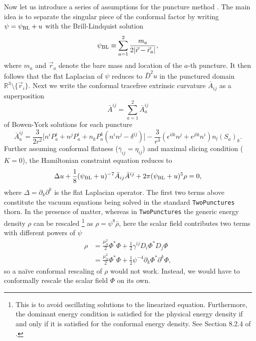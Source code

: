 Now let us introduce a series of assumptions for the puncture method
\cite{scalar_TwoPunctures_BBHSF_Brandt:1997tf}.
The main idea is to separate the singular piece of the conformal factor by writing
$ \psi = \psi_{\rm BL} + u $
with the Brill-Lindquist solution
\begin{equation}
    \psi_{\rm BL} \equiv \sum_{a=1}^2 \frac{m_a}{2|\vec{r} - \vec{r}_a|},
\end{equation}
where $m_a$ and $\vec{r}_a$ denote the bare mass and location of the $a$-th puncture.
It then follows that the flat Laplacian of $\psi$ reduces to $\bar{D}^2 u$ in the punctured domain
$\mathbb{R}^3\setminus\{\vec{r}_i\}$.
Next we write the conformal tracefree extrinsic curvature $\bar{A}_{ij}$ as a superposition
\begin{equation}
    \bar{A}^{ij} = \sum_{a=1}^2 \bar{A}_a^{ij}
\end{equation}
of Bowen-York solutions for each puncture
\begin{equation}
    \bar{A}_a^{ij} = \frac{3}{2r^2} \Big[
        n^i P_a^j + n^j P_a^i + n_k P_a^k (n^i n^j - \delta^{ij}) \Big]
        - \frac{3}{r^3} (\epsilon^{ilk} n^j + \epsilon^{jlk} n^i) n_l {(S_a)}_k.
\end{equation}
Further assuming conformal flatness ($\bar{\gamma}_{ij} = \eta_{ij}$) and maximal slicing condition ($K=0$), the Hamiltonian constraint equation reduces to
\begin{equation}
    \Delta u + \frac{1}{8} (\psi_{\rm BL} + u)^{-7} \bar{A}_{ij} \bar{A}^{ij}
    + 2\pi (\psi_{\rm BL} + u)^5 \rho = 0,
    \label{scalar_TwoPunctures_BBHSF_eq:ham_twopunctures}
\end{equation}
where $\Delta=\partial_k \partial^k$ is the flat Laplacian operator.
The first two terms above constitute the vacuum equations being solved in the standard \texttt{TwoPunctures} thorn.
In the presence of matter, whereas in \texttt{TwoPunctures} the generic energy density $\rho$ can be rescaled
\footnote{
This is to avoid oscillating solutions to the linearized equation.
Furthermore, the dominant energy condition is satisfied for the 
physical energy density if and only if it is satisfied for the conformal energy density.
See Section 8.2.4 of \cite{scalar_TwoPunctures_BBHSF_Gourgoulhon:2007ue}.
} as $\rho = \psi^8 \bar{\rho}$,
here the scalar field contributes two terms with different powers of $\psi$
\begin{align}
    \rho
    &= \frac{\mu_S^2}{2} \Phi^* \Phi
    + \frac{1}{2} \gamma^{ij} D_i\Phi^* D_j \Phi
    \nonumber
    \\
    &= \frac{\mu_S^2}{2} \Phi^* \Phi
    + \frac{1}{2} \psi^{-4} \partial_k\Phi^* \partial^k \Phi,
    \label{scalar_TwoPunctures_BBHSF_eq:rho}
\end{align}
so a na\"{i}ve conformal rescaling of $\rho$ would not work.
Instead, we would have to conformally rescale the scalar field $\Phi$ on its own.


